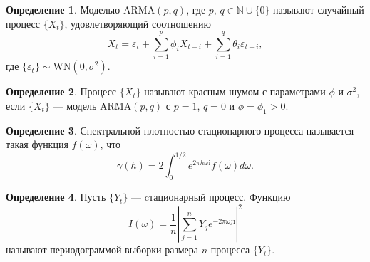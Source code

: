 \documentclass[specialist,
substylefile = spbu_report.rtx,
subf,href,colorlinks=true, 12pt]{disser}
\theoremstyle{definition}
\newtheorem{definition}{Определение}[section]
\newcommand{\im}{\mathrm{i}}
\begin{document}
\begin{definition}
	Моделью $\mathrm{ARMA}(p, q)$, где $p$, $q\in \mathbb{N}\cup\{0\}$ называют случайный процесс $\{X_t\}$, удовлетворяющий соотношению
	\[
		X_t=\varepsilon_t + \sum_{i=1}^p \phi_i X_{t-i} + \sum_{i=1}^q\theta_i\varepsilon_{t-i},
	\]
	где $\{\varepsilon_t\}\sim\mathrm{WN}(0, \sigma^2)$.
\end{definition}

\begin{definition}
	Процесс $\{X_t\}$ называют красным шумом с параметрами $\phi$ и $\sigma^2$, если $\{X_t\}$ --- модель $\mathrm{ARMA}(p, q)$ с $p=1$, $q=0$ и $\phi=\phi_1>0$.
\end{definition}

\begin{definition}
	Спектральной плотностью стационарного процесса называется такая функция $f(\omega)$, что
	\[
		\gamma(h)=2\int_{0}^{1/2} e^{2\pi h\omega\im}f(\omega)d\omega.
	\]
\end{definition}
\begin{definition}
	Пусть $\{Y_t\}$ --- cтационарный процесс. Функцию
	\[
		I(\omega)=\frac1n\left|\sum_{j=1}^{n} Y_je^{-2\pi \omega j\mathrm{i}}\right|^2
	\]
	называют периодограммой выборки размера $n$ процесса $\{Y_t\}$.
\end{definition}
\end{document}
